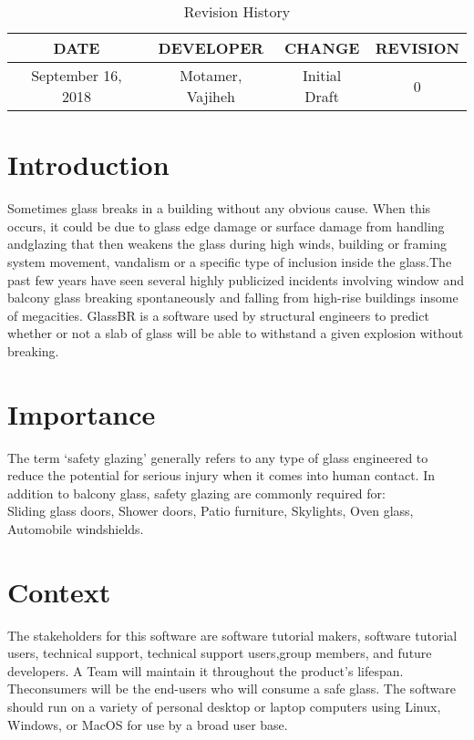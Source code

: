 \documentclass[12pt,letterpaper]{article} \usepackage[utf8]{inputenc}
\begin{document}
\maketitle

\begin{table}[hp] \caption{Revision History} \begin{center} \label{tab:}
\begin{tabular}{|c|c|c|c|} \hline \textbf{DATE} & \textbf{DEVELOPER} &
\textbf{CHANGE} & \textbf{REVISION}\\ \hline September 16, 2018 & Motamer,
Vajiheh & Initial Draft & 0\\ \hline \end{tabular} \end{center} \label{default}
\end{table}


\section{Introduction} Sometimes glass breaks in a building without any obvious
cause. When this occurs, it could be due to glass edge damage or surface damage
from handling andglazing that then weakens the glass during high winds, building
or framing system movement, vandalism or a specific type of inclusion inside the
glass.The past few years have seen several highly publicized incidents involving
window and balcony glass breaking spontaneously and falling from high-rise
buildings insome of megacities. GlassBR is a software used by structural
engineers to predict whether or not a slab of glass will be able to withstand a
given explosion without breaking.

\section{Importance} The term ‘safety glazing’ generally refers to any type of
glass engineered to reduce the potential for serious injury when it comes into
human contact. In addition to balcony glass, safety glazing are commonly
required for:\\ Sliding glass doors, Shower doors, Patio furniture, Skylights,
Oven glass, Automobile windshields.


\section{Context}

The stakeholders for this software are software tutorial makers, software
tutorial users, technical support, technical support users,group members, and
future developers. A Team will maintain it throughout the product’s lifespan.
Theconsumers will be the end-users who will consume a safe glass. The software
should run on a variety of personal desktop or laptop computers using Linux,
Windows, or MacOS for use by a broad user base.

\end{document}
